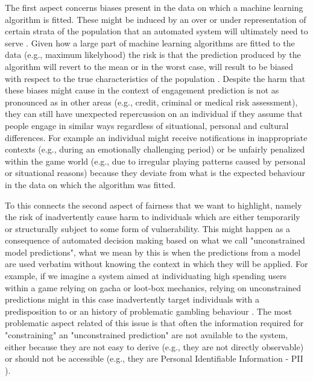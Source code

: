 The first aspect concerns biases present in the data on which a machine learning algorithm is fitted. These might be induced by an over or under representation of certain strata of the population that an automated system will ultimately need to serve \cite{mehrabi2021survey}. Given how a large part of machine learning algorithms are fitted to the data (e.g., maximum likelyhood) the risk is that the prediction produced by the algorithm will revert to the mean or in the worst case, will result to be biased with respect to the true characteristics of the population \cite{corbett2018measure, mehrabi2021survey}. Despite the harm that these biases might cause in the context of engagement prediction is not as pronounced as in other areas (e.g., credit, criminal or medical risk assessment), they can still have unexpected repercussion on an individual if they assume that people engage in similar ways regardless of situational, personal and cultural differences. For example an individual might receive notifications in inappropriate contexts (e.g.,  during an emotionally challenging period) or be unfairly penalized within the game world (e.g., due to irregular playing patterns caused by personal or situational reasons) because they deviate from what is the expected behaviour in the data on which the algorithm was fitted.

To this connects the second aspect of fairness that we want to highlight, namely the risk of inadvertently cause harm to individuals which are either temporarily or structurally subject to some form of vulnerability. This might happen as a consequence of automated decision making based on what we call "unconstrained model predictions", what we mean by this is when the predictions from a model are used verbatim without knowing the context in which they will be applied. For example, if we imagine a system aimed at individuating high spending users within a game relying on gacha or loot-box mechanics, relying on unconstrained predictions might in this case inadvertently target individuals with a predisposition to or an history of problematic gambling behaviour \cite{petrovskaya2022prevalence}. The most problematic aspect related of this issue is that often the information required for "constraining" an "unconstrained prediction" are not available to the system, either because they are not easy to derive (e.g., they are not directly observable) or should not be accessible (e.g., they are Personal Identifiable Information - PII \cite{EUdataregulations2018}).

